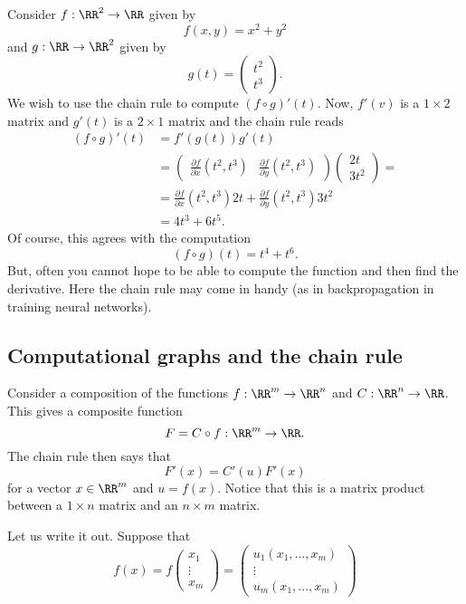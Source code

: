 \documentclass{article}
\newcommand{\pd}[2]{\frac{\partial #1}{\partial #2}}
\begin{document}
\begin{example}
Consider $f:\RR^2\rightarrow \RR$ given by 
$$
f(x, y) = x^2 + y^2
$$ 
and
$g:\RR \rightarrow \RR^2$ given by
$$
g(t) = \begin{pmatrix}
t^2\\
t^3
\end{pmatrix}.
$$
We wish to use the chain rule to compute $(f\circ g)'(t)$. Now,
$f'(v)$ is a $1\times 2$ matrix and $g'(t)$ is a $2\times 1$ matrix
and the chain rule reads
\begin{align*}
(f\circ g)'(t) &= f'(g(t)) g'(t) \\
&= \begin{pmatrix} \pd{f}{x}(t^2, t^3) & \pd{f}{y}(t^2, t^3) \end{pmatrix}
\begin{pmatrix}
2 t\\
3 t^2
\end{pmatrix} =\\
&= \pd{f}{x}(t^2, t^3) 2 t + \pd{f}{y}(t^2, t^3) 3 t^2 \\
&= 4 t^3 + 6 t^5.
\end{align*}
Of course, this agrees with the computation
$$
(f\circ g)(t) = t^4 + t^6.
$$
But, often you cannot hope to be able to compute the function and then find
the derivative. Here the chain rule may come in handy (as in backpropagation in
training neural networks).
\end{example}


\subsection{Computational graphs and the chain rule}

Consider a composition of the functions $f:\RR^m\rightarrow \RR^n$ and
$C: \RR^n\rightarrow \RR$. This gives a composite function
$$
F = C\circ f: \RR^m\rightarrow \RR.
$$
The chain rule then says that
$$
F'(x) = C'(u) F'(x)
$$ for
a vector $x\in \RR^m$ and $u = f(x)$. Notice that this is a matrix
product between a $1\times n$ matrix and an $n\times m$ matrix.


Let us write it out. Suppose that 
$$
f(x) = 
f
\begin{pmatrix}
  x_1\\ \vdots \\ x_m
\end{pmatrix} =
\begin{pmatrix}
  u_1(x_1, \dots, x_m) \\ \vdots \\ u_m(x_1, \dots, x_m)
\end{pmatrix}
$$
\end{document}
